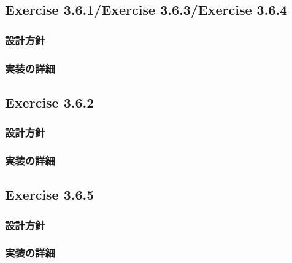 \documentclass{jarticle}
\begin{document}
\subsection{Exercise 3.6.1/Exercise 3.6.3/Exercise 3.6.4}
\subsubsection{設計方針}
\subsubsection{実装の詳細}

\subsection{Exercise 3.6.2}
\subsubsection{設計方針}
\subsubsection{実装の詳細}

\subsection{Exercise 3.6.5}
\subsubsection{設計方針}
\subsubsection{実装の詳細}
\end{document}
